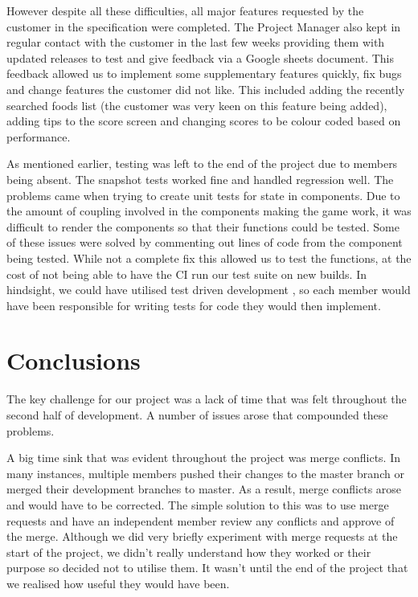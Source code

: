 \documentclass{l3proj}
\begin{document}
However despite all these difficulties, all major features requested by the customer in the specification were completed. The Project Manager also kept in regular contact with the customer in the last few weeks providing them with updated releases to test and give feedback via a Google sheets document. This feedback allowed us to implement some supplementary features quickly, fix bugs and change features the customer did not like. This included adding the recently searched foods list (the customer was very keen on this feature being added), adding tips to the score screen and changing scores to be colour coded based on performance. 

As mentioned earlier, testing was left to the end of the project due to members being absent. The snapshot tests worked fine and handled regression well. The problems came when trying to create unit tests for state in components. Due to the amount of coupling involved in the components making the game work, it was difficult to render the components so that their functions could be tested. Some of these issues were solved by commenting out lines of code from the component being tested. While not a complete fix this allowed us to test the functions, at the cost of not being able to have the CI run our test suite on new builds. In hindsight, we could have utilised test driven development \cite{tdd}, so each member would have been responsible for writing tests for code they would then implement.

\section{Conclusions}
\label{sec:conclusions}


The key challenge for our project was a lack of time that was felt throughout the second half of development. A number of issues arose that compounded these problems.

A big time sink that was evident throughout the project was merge conflicts. In many instances, multiple members pushed their changes to the master branch or merged their development branches to master. As a result, merge conflicts arose and would have to be corrected. The simple solution to this was to use merge requests and have an independent member review any conflicts and approve of the merge. Although we did very briefly experiment with merge requests at the start of the project, we didn't really understand how they worked or their purpose so decided not to utilise them. It wasn't until the end of the project that we realised how useful they would have been.
\end{document}
